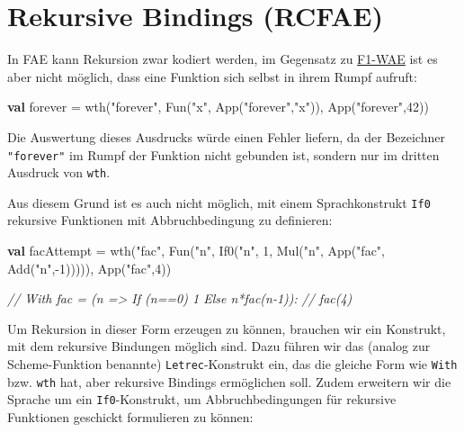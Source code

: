 \documentclass[]{article}
\newenvironment{Shaded}{}{}
\newcommand{\CommentTok}[1]{\textcolor[rgb]{0.38,0.63,0.69}{\textit{#1}}}
\newcommand{\DecValTok}[1]{\textcolor[rgb]{0.25,0.63,0.44}{#1}}
\newcommand{\FunctionTok}[1]{\textcolor[rgb]{0.02,0.16,0.49}{#1}}
\newcommand{\KeywordTok}[1]{\textcolor[rgb]{0.00,0.44,0.13}{\textbf{#1}}}
\newcommand{\NormalTok}[1]{#1}
\newcommand{\StringTok}[1]{\textcolor[rgb]{0.25,0.44,0.63}{#1}}
\begin{document}
\hypertarget{rekursive-bindings-rcfae}{%
\section{Rekursive Bindings (RCFAE)}\label{rekursive-bindings-rcfae}}

In FAE kann Rekursion zwar kodiert werden, im Gegensatz zu
\protect\hyperlink{first-order-funktionen-f1-wae}{F1-WAE} ist es aber
nicht möglich, dass eine Funktion sich selbst in ihrem Rumpf aufruft:

\begin{Shaded}
\begin{Highlighting}[]
\KeywordTok{val}\NormalTok{ forever = }\FunctionTok{wth}\NormalTok{(}\StringTok{"forever"}\NormalTok{, }\FunctionTok{Fun}\NormalTok{(}\StringTok{"x"}\NormalTok{, }\FunctionTok{App}\NormalTok{(}\StringTok{"forever"}\NormalTok{,}\StringTok{"x"}\NormalTok{)), }\FunctionTok{App}\NormalTok{(}\StringTok{"forever"}\NormalTok{,}\DecValTok{42}\NormalTok{))}
\end{Highlighting}
\end{Shaded}

Die Auswertung dieses Ausdrucks würde einen Fehler liefern, da der
Bezeichner \texttt{"forever"} im Rumpf der Funktion nicht gebunden ist,
sondern nur im dritten Ausdruck von \texttt{wth}.

Aus diesem Grund ist es auch nicht möglich, mit einem Sprachkonstrukt
\texttt{If0} rekursive Funktionen mit Abbruchbedingung zu definieren:

\begin{Shaded}
\begin{Highlighting}[]
\KeywordTok{val}\NormalTok{ facAttempt = }
  \FunctionTok{wth}\NormalTok{(}\StringTok{"fac"}\NormalTok{, }
      \FunctionTok{Fun}\NormalTok{(}\StringTok{"n"}\NormalTok{, }\FunctionTok{If0}\NormalTok{(}\StringTok{"n"}\NormalTok{, }\DecValTok{1}\NormalTok{, }\FunctionTok{Mul}\NormalTok{(}\StringTok{"n"}\NormalTok{, }\FunctionTok{App}\NormalTok{(}\StringTok{"fac"}\NormalTok{, }\FunctionTok{Add}\NormalTok{(}\StringTok{"n"}\NormalTok{,{-}}\DecValTok{1}\NormalTok{))))), }
      \FunctionTok{App}\NormalTok{(}\StringTok{"fac"}\NormalTok{,}\DecValTok{4}\NormalTok{))}

\CommentTok{// With fac = (n =\textgreater{} If (n==0) 1 Else n*fac(n{-}1)): }
\CommentTok{//   fac(4)}
\end{Highlighting}
\end{Shaded}

Um Rekursion in dieser Form erzeugen zu können, brauchen wir ein
Konstrukt, mit dem rekursive Bindungen möglich sind. Dazu führen wir das
(analog zur Scheme-Funktion benannte) \texttt{Letrec}-Konstrukt ein, das
die gleiche Form wie \texttt{With} bzw. \texttt{wth} hat, aber rekursive
Bindings ermöglichen soll. Zudem erweitern wir die Sprache um ein
\texttt{If0}-Konstrukt, um Abbruchbedingungen für rekursive Funktionen
geschickt formulieren zu können:
\end{document}
